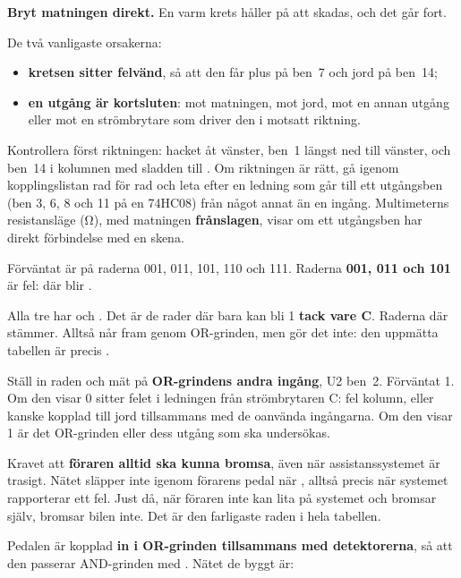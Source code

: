 \textbf{Bryt matningen direkt.} En varm krets håller på att skadas, och det går fort.

De två vanligaste orsakerna:
\begin{itemize}
  \item \textbf{kretsen sitter felvänd}, så att den får plus på ben~7 och jord på ben~14;
  \item \textbf{en utgång är kortsluten}: mot matningen, mot jord, mot en annan utgång eller mot en
    strömbrytare som driver den i motsatt riktning.
\end{itemize}

Kontrollera först riktningen: hacket åt vänster, ben~1 längst ned till vänster, och ben~14 i
kolumnen med sladden till \code{+}. Om riktningen är rätt, gå igenom kopplingslistan rad för rad
och leta efter en ledning som går till ett utgångsben (ben 3, 6, 8 och 11 på en 74HC08) från något
annat än en ingång. Multimeterns resistansläge (Ω), med matningen \textbf{frånslagen}, visar om ett
utgångsben har direkt förbindelse med en skena.

Förväntat är  på raderna 001, 011, 101, 110 och 111. Raderna \textbf{001, 011
och 101} är fel: där blir .

Alla tre har  och . Det är de rader där  bara kan bli 1
\textbf{tack vare C}. Raderna där  stämmer. Alltså når  fram genom
OR-grinden, men  gör det inte: den uppmätta tabellen är precis .

Ställ in raden  och mät på \textbf{OR-grindens andra ingång}, U2 ben~2.
Förväntat 1. Om den visar 0 sitter felet i ledningen från strömbrytaren C: fel kolumn, eller
kanske kopplad till jord tillsammans med de oanvända ingångarna. Om den visar 1 är det OR-grinden
eller dess utgång som ska undersökas.

Kravet att \textbf{föraren alltid ska kunna bromsa}, även när assistanssystemet är trasigt.
Nätet släpper inte igenom förarens pedal när , alltså precis när systemet rapporterar
ett fel. Just då, när föraren inte kan lita på systemet och bromsar själv, bromsar bilen inte. Det
är den farligaste raden i hela tabellen.

Pedalen är kopplad \textbf{in i OR-grinden tillsammans med detektorerna}, så att den passerar
AND-grinden med . Nätet de byggt är:


